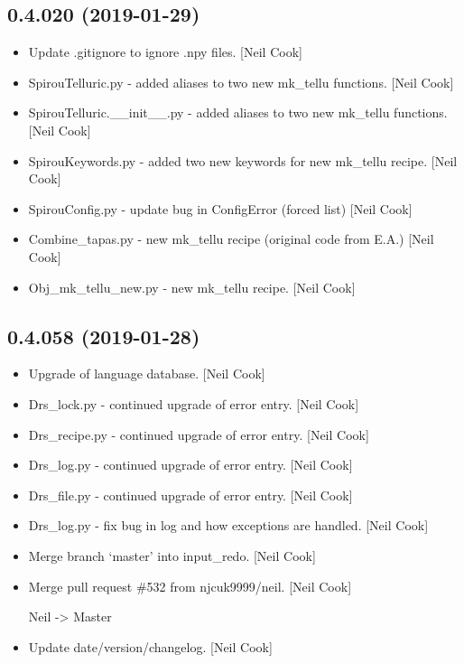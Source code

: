 \documentclass[a4paper,10pt,english]{report}
\begin{document}
\subsection{0.4.020 (2019-01-29)}
\label{\detokenize{misc/changelog:id202}}\begin{itemize}
\item {} 
Update .gitignore to ignore .npy files. {[}Neil Cook{]}

\item {} 
SpirouTelluric.py - added aliases to two new mk\_tellu functions. {[}Neil
Cook{]}

\item {} 
SpirouTelluric.\_\_init\_\_.py - added aliases to two new mk\_tellu
functions. {[}Neil Cook{]}

\item {} 
SpirouKeywords.py - added two new keywords for new mk\_tellu recipe.
{[}Neil Cook{]}

\item {} 
SpirouConfig.py - update bug in ConfigError (forced list) {[}Neil Cook{]}

\item {} 
Combine\_tapas.py - new mk\_tellu recipe (original code from E.A.) {[}Neil
Cook{]}

\item {} 
Obj\_mk\_tellu\_new.py - new mk\_tellu recipe. {[}Neil Cook{]}

\end{itemize}


\subsection{0.4.058 (2019-01-28)}
\label{\detokenize{misc/changelog:id203}}\begin{itemize}
\item {} 
Upgrade of language database. {[}Neil Cook{]}

\item {} 
Drs\_lock.py - continued upgrade of error entry. {[}Neil Cook{]}

\item {} 
Drs\_recipe.py - continued upgrade of error entry. {[}Neil Cook{]}

\item {} 
Drs\_log.py - continued upgrade of error entry. {[}Neil Cook{]}

\item {} 
Drs\_file.py - continued upgrade of error entry. {[}Neil Cook{]}

\item {} 
Drs\_log.py - fix bug in log and how exceptions are handled. {[}Neil
Cook{]}

\item {} 
Merge branch ‘master’ into input\_redo. {[}Neil Cook{]}

\item {} 
Merge pull request \#532 from njcuk9999/neil. {[}Neil Cook{]}

Neil -\textgreater{} Master

\item {} 
Update date/version/changelog. {[}Neil Cook{]}

\end{itemize}
\end{document}
